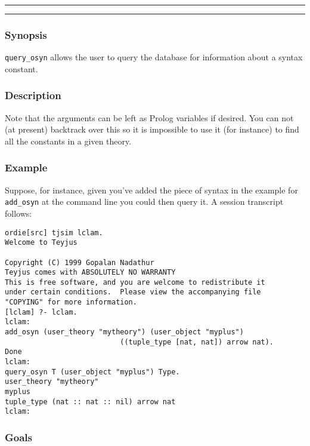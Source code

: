 \vspace{2mm}
\hrule 
\vspace{2mm}
\begin{Large}
\end{Large}
\vspace{2mm}
\hrule
\vspace{2mm}


\subsubsection*{Synopsis}
{\tt query\_osyn} allows the user to query the database for
information about a syntax constant.  

\subsubsection*{Description}
Note that the arguments can be
left as Prolog variables if desired.  You can not (at present)
backtrack over this so it is impossible to use it (for instance) to
find all the constants in a given theory.

\subsubsection*{Example}
Suppose, for instance, given you've added the piece of syntax in the
example for {\tt add\_osyn} at the
command line you could then query it.  A session transcript follows:

\begin{verbatim}
ordie[src] tjsim lclam.
Welcome to Teyjus

Copyright (C) 1999 Gopalan Nadathur
Teyjus comes with ABSOLUTELY NO WARRANTY
This is free software, and you are welcome to redistribute it
under certain conditions.  Please view the accompanying file
"COPYING" for more information.
[lclam] ?- lclam.
lclam:
add_osyn (user_theory "mytheory") (user_object "myplus") 
                           ((tuple_type [nat, nat]) arrow nat).
Done
lclam:
query_osyn T (user_object "myplus") Type.
user_theory "mytheory"
myplus
tuple_type (nat :: nat :: nil) arrow nat
lclam:
\end{verbatim}

\subsubsection{Goals}

